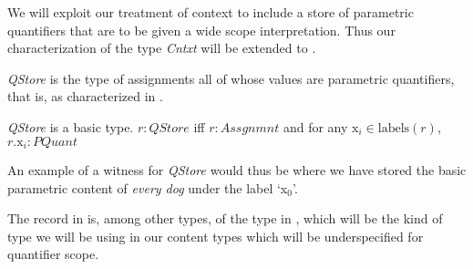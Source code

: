 We will exploit our treatment of context to include a store of
parametric quantifiers that are to be given a wide scope
interpretation.  Thus our characterization of the type \textit{Cntxt}
will be extended to \nexteg{}.
\begin{ex} 
\end{ex}

\textit{QStore} is the type of assignments all of whose values are
parametric quantifiers, that is, as characterized in \nexteg{}.
\begin{ex} 
\textit{QStore} is a basic type.  $r:\textit{QStore}$ iff $r:Assgnmnt$
and for any $\text{x}_i\in\mathrm{labels}(r)$, $r.\text{x}_i:\textit{PQuant}$ 
\end{ex} 
An example of a witness for \textit{QStore} would thus be \nexteg{}
where we have stored the basic parametric content of \textit{every
  dog} under the label `x$_0$'.
\begin{ex} 
        
\end{ex} 
The record in \preveg{} is, among other types, of the type in
\nexteg{}, which will be the kind of type we will be using in our
content types which will be underspecified for quantifier scope.
\begin{ex} 
        
\end{ex}
